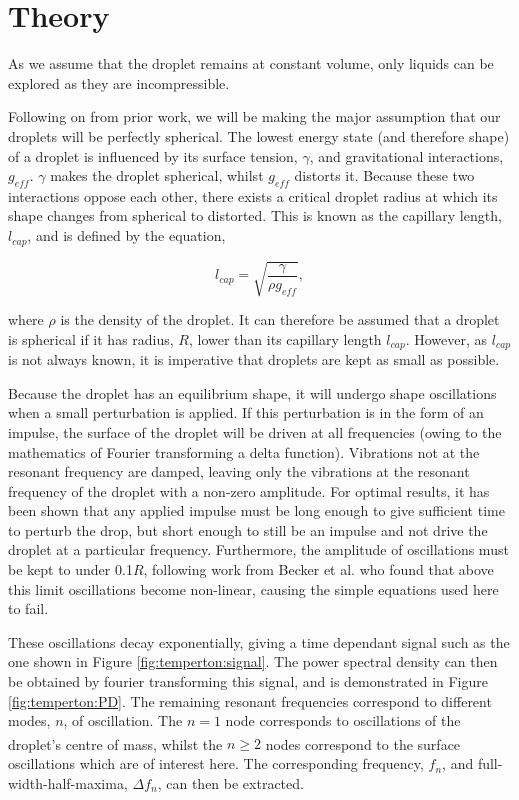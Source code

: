 \documentclass{physics_article_B}
\begin{document}
\section{Theory\label{sect:theory}}

    As we assume that the droplet remains at constant volume, only liquids can be explored as they are incompressible.

    Following on from prior work, we will be making the major assumption that our droplets will be perfectly spherical. The lowest energy state (and therefore shape) of a droplet is influenced by its surface tension, $\gamma$, and gravitational interactions, $g_{eff}$. $\gamma$ makes the droplet spherical, whilst $g_{eff}$ distorts it. Because these two interactions oppose each other, there exists a critical droplet radius at which its shape changes from spherical to distorted. This is known as the capillary length, $l_{cap}$, and is defined by the equation\cite{temperton},
        
        \begin{equation} 
        \label{eq:lcap}
            l_{cap} = \sqrt{\frac{\gamma }{\rho g_{eff} }}, 
        \end{equation}
    
    where $\rho$ is the density of the droplet. It can therefore be assumed that a droplet is spherical if it has radius, $R$, lower than its capillary length $l_{cap}$. However, as $l_{cap}$ is not always known, it is imperative that droplets are kept as small as possible. 

    Because the droplet has an equilibrium shape, it will undergo shape oscillations when a small perturbation is applied\cite{oscillate}. If this perturbation is in the form of an impulse, the surface of the droplet will be driven at all frequencies (owing to the mathematics of Fourier transforming a delta function). Vibrations not at the resonant frequency are damped, leaving only the vibrations at the resonant frequency of the droplet with a non-zero amplitude. For optimal results, it has been shown that any applied impulse must be long enough to give sufficient time to perturb the drop, but short enough to still be an impulse and not drive the droplet at a particular frequency\cite{temperton}. Furthermore, the amplitude of oscillations must be kept to under 0.1$R$, following work from Becker et al. who found that above this limit oscillations become non-linear, causing the simple equations used here to fail\cite{becker}.
    
    These oscillations decay exponentially, giving a time dependant signal such as the one shown in Figure \ref{fig:temperton:signal}. The power spectral density can then be obtained by fourier transforming this signal, and is demonstrated in Figure \ref{fig:temperton:PD}. The remaining resonant frequencies correspond to different modes, $n$, of oscillation. The $n=1$ node corresponds to oscillations of the droplet's centre of mass\textsuperscript{\cite{miller}}, whilst the $n\geq2$ nodes correspond to the surface oscillations which are of interest here. The corresponding frequency, $f_n$, and full-width-half-maxima, $\Delta f_n$, can then be extracted. 
\end{document}
